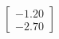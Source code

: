 \documentclass[preview]{standalone}
\begin{document}
\begin{align*}
\begin{bmatrix} -1.20 \\ -2.70 \end{bmatrix}
\end{align*}
\end{document}
